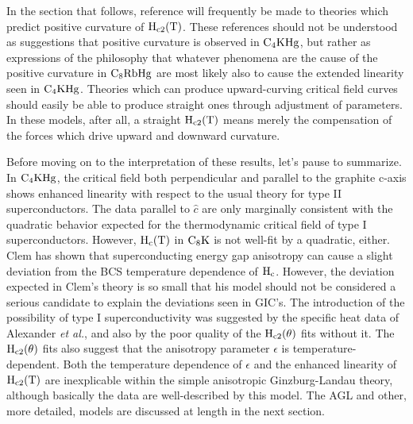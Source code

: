         In the section that  follows,  reference will frequently be made to
theories  which predict positive   curvature  of   $\rm H_{c2}(T)$.   These
references should not be understood  as suggestions that positive curvature
is observed in  $\rm C_4KHg$, but  rather as expressions  of the philosophy
that whatever phenomena  are  the cause  of  the positive curvature in $\rm
C_8RbHg$ are most likely also to cause the extended  linearity seen in $\rm
C_4KHg$.  Theories which  can produce upward-curving critical field  curves
should easily be able to  produce straight ones through  adjustment of
parameters.  In these models,  after all, a straight  $\rm H_{c2}(T)$ means
merely  the  compensation  of the  forces  which  drive upward and downward
curvature.

        Before moving on  to the   interpretation of  these results,  let's
pause to summarize.  In $\rm C_4KHg$, the critical field both perpendicular
and parallel  to the graphite  c-axis shows enhanced linearity with respect
to the usual theory  for type II  superconductors.  The data   parallel  to
$\hat{c}$  are  only   marginally  consistent with   the quadratic behavior
expected for the  thermodynamic critical field  of type I  superconductors.
However, $\rm H_c(T)$ in $\rm C_8K$ is not well-fit by a quadratic, either.
Clem has shown   that superconducting  energy gap  anisotropy  can cause  a
slight deviation   from   the    BCS    temperature  dependence     of $\rm
H_{c}$.\cite{clem66} However, the deviation expected in Clem's theory is so
small that his  model  should not  be  considered  a  serious candidate  to
explain the deviations seen in GIC's.   The introduction of the possibility
of type I  superconductivity was suggested  by  the specific heat  data  of
Alexander {\em et   al.\/},  and   also by  the  poor quality  of the  $\rm
H_{c2}(\theta)$   fits  without it.   The  $\rm  H_{c2}(\theta)$  fits also
suggest that  the anisotropy parameter $\epsilon$ is temperature-dependent.
Both the temperature dependence of $\epsilon$ and the enhanced linearity of
$\rm  H_{c2}(T)$    are inexplicable      within  the simple    anisotropic
Ginzburg-Landau   theory,\cite{tilley65,lawrence71}  although basically the
data are well-described by this  model.  The AGL and other,  more detailed,
models are discussed at length in the next section.
